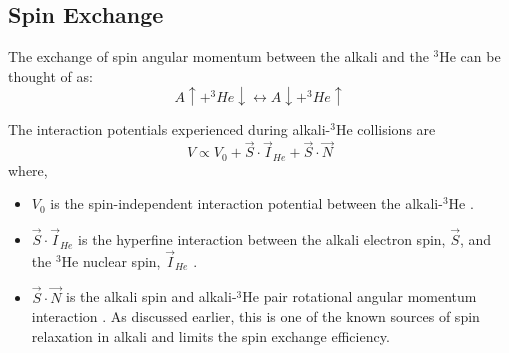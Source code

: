 \subsection{Spin Exchange}

The exchange of spin angular momentum between the alkali and the $^3$He can be thought of as:
\begin{equation}
    A \uparrow + ^3He \downarrow \leftrightarrow A \downarrow + ^3He \uparrow
\end{equation}

The interaction potentials experienced during alkali-$^3$He collisions are
\begin{equation}
    V \propto V_0 + \Vec{S} \cdot \Vec{I}_{He} + \Vec{S} \cdot \Vec{N}
\label{eq:SEpot}
\end{equation}
where,
\begin{itemize}
    \item $V_0$ is the spin-independent interaction potential between the alkali-$^3$He \cite{Partridge2001, Tscherbul2011}.
    \item $\Vec{S} \cdot \Vec{I}_{He}$ is the hyperfine interaction between the alkali electron spin, $\Vec{S}$, and the $^3$He nuclear spin, $\Vec{I}_{He}$ \cite{Partridge2001, Tscherbul2011}.
    \item $\Vec{S} \cdot \Vec{N}$ is the alkali spin and alkali-$^3$He pair rotational angular momentum interaction \cite{Walker1997}. As discussed earlier, this is one of the known sources of spin relaxation in alkali and limits the spin exchange efficiency.
\end{itemize}


